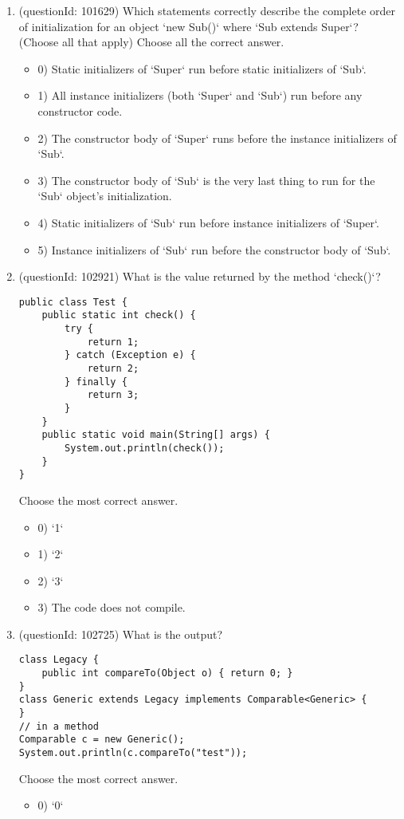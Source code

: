 \documentclass[12pt]{article}
\begin{document}
\begin{enumerate}[label=(\arabic*)]
\begin{itemize}
\end{itemize}
\item (questionId: 101629) Which statements correctly describe the complete order of initialization for an object `new Sub()` where `Sub extends Super`? (Choose all that apply)
Choose all the correct answer.\begin{itemize}
\item 0) Static initializers of `Super` run before static initializers of `Sub`.

\item 1) All instance initializers (both `Super` and `Sub`) run before any constructor code.

\item 2) The constructor body of `Super` runs before the instance initializers of `Sub`.

\item 3) The constructor body of `Sub` is the very last thing to run for the `Sub` object's initialization.

\item 4) Static initializers of `Sub` run before instance initializers of `Super`.

\item 5) Instance initializers of `Sub` run before the constructor body of `Sub`.

\end{itemize}
\item (questionId: 102921) What is the value returned by the method `check()`?
\begin{verbatim}
public class Test {
    public static int check() {
        try {
            return 1;
        } catch (Exception e) {
            return 2;
        } finally {
            return 3;
        }
    }
    public static void main(String[] args) {
        System.out.println(check());
    }
}
\end{verbatim}
Choose the most correct answer. 
\begin{itemize}
\item 0) `1`

\item 1) `2`

\item 2) `3`

\item 3) The code does not compile.

\end{itemize}
\item (questionId: 102725) What is the output?
\begin{verbatim}
class Legacy {
    public int compareTo(Object o) { return 0; }
}
class Generic extends Legacy implements Comparable<Generic> {
}
// in a method
Comparable c = new Generic();
System.out.println(c.compareTo("test"));
\end{verbatim}
Choose the most correct answer. 
\begin{itemize}
\item 0) `0`


\end{itemize}
\end{enumerate}
\end{document}

